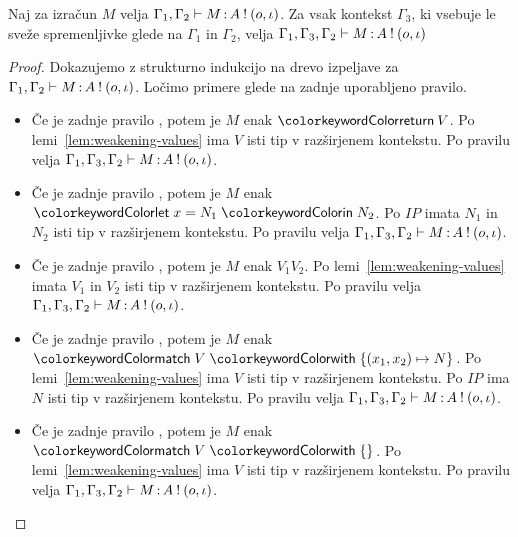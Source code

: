 \begin{lema}\label{lem:weakening-comp}
	Naj za izračun $M$ velja $\Gamma_1, \Gamma_2 \vdash M \mathinner{:} A \mathbin{!} (o, \iota)$. Za vsak kontekst $\Gamma_3$, ki vsebuje le sveže spremenljivke glede na $\Gamma_1$ in $\Gamma_2$, velja $\Gamma_1, \Gamma_3, \Gamma_2 \vdash M \mathinner{:} A \mathbin{!} (o, \iota)$
\end{lema}

\begin{proof}
	Dokazujemo z strukturno indukcijo na drevo izpeljave za $\Gamma_1, \Gamma_2 \vdash M \mathinner{:} A \mathbin{!} (o, \iota)$.
	Ločimo primere glede na zadnje uporabljeno pravilo.
	
	\begin{itemize}
		\item Če je zadnje pravilo , potem je $M$ enak $\tmreturn{V}$.
		Po lemi~\ref{lem:weakening-values} ima $V$ isti tip v razširjenem kontekstu.
		Po pravilu  velja $\Gamma_1, \Gamma_3, \Gamma_2 \vdash M \mathinner{:} A \mathbin{!} (o, \iota)$.
		
		\item Če je zadnje pravilo , potem je $M$ enak $\tmlet{x}{N_1}{N_2}$.
		Po $IP$ imata $N_1$ in $N_2$ isti tip v razširjenem kontekstu.
		Po pravilu  velja $\Gamma_1, \Gamma_3, \Gamma_2 \vdash M \mathinner{:} A \mathbin{!} (o, \iota)$.
		
		\item Če je zadnje pravilo , potem je $M$ enak $V_1 V_2$.
		Po lemi~\ref{lem:weakening-values} imata $V_1$ in $V_2$ isti tip v razširjenem kontekstu.
		Po pravilu  velja $\Gamma_1, \Gamma_3, \Gamma_2 \vdash M \mathinner{:} A \mathbin{!} (o, \iota)$.
		
		\item Če je zadnje pravilo , potem je $M$ enak $\tmmatch{V}{(x_1,x_2) \mapsto N}$. 
		Po lemi~\ref{lem:weakening-values} ima $V$ isti tip v razširjenem kontekstu.
		Po $IP$ ima $N$ isti tip v razširjenem kontekstu.
		Po pravilu  velja $\Gamma_1, \Gamma_3, \Gamma_2 \vdash M \mathinner{:} A \mathbin{!} (o, \iota)$.
		
		\item Če je zadnje pravilo , potem je $M$ enak $\tmmatch{V}{}$.
		Po lemi~\ref{lem:weakening-values} ima $V$ isti tip v razširjenem kontekstu.
		Po pravilu  velja $\Gamma_1, \Gamma_3, \Gamma_2 \vdash M \mathinner{:} A \mathbin{!} (o, \iota)$.
		

\end{itemize}
\end{proof}

